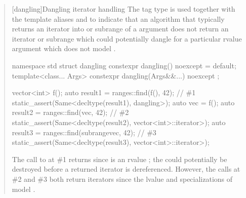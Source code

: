 \begin{quote}
\begin{addedblock}
\setcounter{chapter}{23}
\setcounter{section}{6}
\setcounter{subsection}{3}
[dangling]{Dangling iterator handling}
\pnum
The tag type  is used together with the template aliases
 and  to indicate that
an algorithm that typically returns an iterator into or
subrange of a  argument does not return
an iterator or subrange which could potentially dangle
for a particular rvalue  argument which
does not model .

\begin{codeblock}
namespace std {
  struct dangling {
    constexpr dangling() noexcept = default;
    template<class... Args>
      constexpr dangling(Args&&...) noexcept { }
  };
}
\end{codeblock}

\pnum
\begin{example}
\begin{codeblock}
vector<int> f();
auto result1 = ranges::find(f(), 42); // \#1
static_assert(Same<decltype(result1), dangling>);
auto vec = f();
auto result2 = ranges::find(vec, 42); // \#2
static_assert(Same<decltype(result2), vector<int>::iterator>);
auto result3 = ranges::find(subrange{vec}, 42); // \#3
static_assert(Same<decltype(result3), vector<int>::iterator>);
\end{codeblock}
The call to  at \#1 returns  since
 is an rvalue ; the  could potentially
be destroyed before a returned iterator is dereferenced. However, the calls
at \#2 and \#3 both return iterators since the lvalue  and
specializations of  model .
\end{example}
\end{addedblock}
\end{quote}


